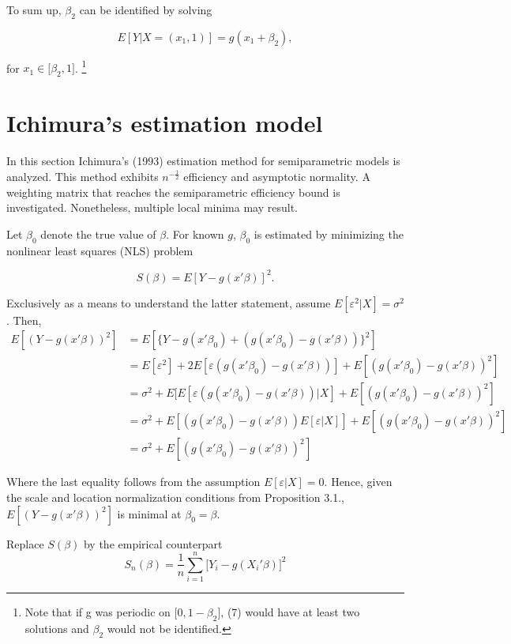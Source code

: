 \documentclass[a4paper]{article}
\begin{document}
To sum up, $\beta_2$ can be identified by solving

\begin{equation}
E[Y| X = (x_1,1)] = g(x_1 + \beta_2),
\end{equation}

for $x_1 \in \big[\beta_2, 1\big]$. \footnote{Note that if g was periodic on $\big[0, 1 - \beta_2 \big]$, (7) would have at least two solutions and $\beta_2$ would not be identified.}


\section{Ichimura's estimation model} %
\label{sec:Ichimura's estimation model}

In this section Ichimura's (1993) estimation method for semiparametric models is analyzed. This method exhibits $n^{-\frac{1}{2}}$ efficiency and asymptotic normality. A weighting matrix that reaches the semiparametric efficiency bound is investigated. Nonetheless, multiple local minima may result. 

Let $\beta_0$ denote the true value of $\beta$. For known $g$, $\beta_0$ is estimated by minimizing the nonlinear least squares (NLS) problem

\[
S(\beta) = E[Y - g(x'\beta)]^2. \]

Exclusively as a means to understand the latter statement, assume $E[\varepsilon^2|X]=\sigma^2$. Then,
\begin{align*}
E[(Y - g(x'\beta))^2] & = E[\{Y - g(x'\beta_0) + (g(x'\beta_0) - g(x'\beta))\}^2]\\
                   & = E[\varepsilon^2] + 2E[\varepsilon (g(x'\beta_0) - g(x'\beta)) ] + E[(g(x'\beta_0) - g(x'\beta))^2]\\                 & = \sigma^2 + E[E[\varepsilon (g(x'\beta_0) - g(x'\beta))|X] + E[(g(x'\beta_0) - g(x'\beta))^2]  \\
                   &= \sigma^2 + E[(g(x'\beta_0) - g(x'\beta))E[\varepsilon|X]] + E[(g(x'\beta_0) - g(x'\beta))^2] \\
                   &= \sigma^2 + E[(g(x'\beta_0) - g(x'\beta))^2]
\end{align*}

Where the last equality follows from the assumption $E[\varepsilon|X]=0$. Hence, given the scale and location normalization conditions from Proposition 3.1., $E[(Y - g(x'\beta))^2]$ is minimal at $\beta_0 = \beta$.

Replace $S(\beta)$ by the empirical counterpart 
\begin{equation}
S_n(\beta) = \frac{1}{n}\sum_{i = 1}^n\big[Y_i - g(X_i'\beta)\big]^2
\end{equation}
\end{document}
